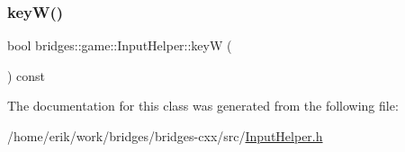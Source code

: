 \mbox{\label{classbridges_1_1game_1_1_input_helper_a97a204c00019b28b4e95dde0b757a1aa}} 
\subsubsection{\texorpdfstring{key\+W()}{keyW()}}
{\footnotesize\ttfamily bool bridges\+::game\+::\+Input\+Helper\+::keyW (\begin{DoxyParamCaption}{ }\end{DoxyParamCaption}) const\hspace{0.3cm}{\ttfamily [inline]}}



The documentation for this class was generated from the following file\+:\begin{DoxyCompactItemize}
\item 
/home/erik/work/bridges/bridges-\/cxx/src/\hyperlink{_input_helper_8h}{Input\+Helper.\+h}\end{DoxyCompactItemize}
